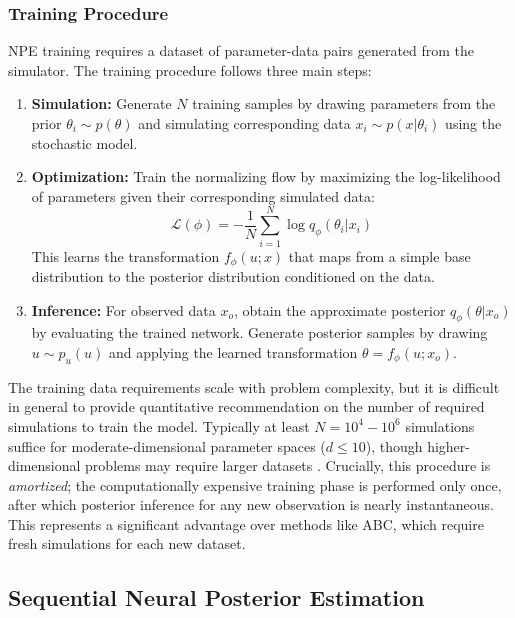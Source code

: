 \documentclass{article}
\begin{document}
\subsubsection{Training Procedure}

NPE training requires a dataset of parameter-data pairs generated from the simulator. The training procedure follows three main steps:

\begin{enumerate}
	\item \textbf{Simulation:} Generate $N$ training samples by drawing parameters from the prior $\theta_i \sim p(\theta)$ and simulating corresponding data $x_i \sim p(x|\theta_i)$ using the stochastic model. 
	
	\item \textbf{Optimization:} Train the normalizing flow by maximizing the log-likelihood of parameters given their corresponding simulated data:
	\begin{equation}
		\mathcal{L}(\phi) = -\frac{1}{N} \sum_{i=1}^N \log q_\phi(\theta_i | x_i)
	\end{equation}
	This learns the transformation $f_\phi(u; x)$ that maps from a simple base distribution to the posterior distribution conditioned on the data.
	
	\item \textbf{Inference:} For observed data $x_o$, obtain the approximate posterior $q_\phi(\theta | x_o)$ by evaluating the trained network. Generate posterior samples by drawing $u \sim p_u(u)$ and applying the learned transformation $\theta = f_\phi(u; x_o)$.
\end{enumerate}
The training data requirements scale with problem complexity, but it is difficult in general to provide quantitative recommendation on the number of required simulations to train the model. Typically at least $N = 10^4 - 10^6$ simulations suffice for moderate-dimensional parameter spaces ($d \leq 10$), though higher-dimensional problems may require larger datasets \citep{2025arXiv250812939D}. Crucially, this procedure is \textit{amortized}; the computationally expensive training phase is performed only once, after which posterior inference for any new observation is nearly instantaneous. This represents a significant advantage over methods like ABC, which require fresh simulations for each new dataset.

\subsection{Sequential Neural Posterior Estimation}
\end{document}
